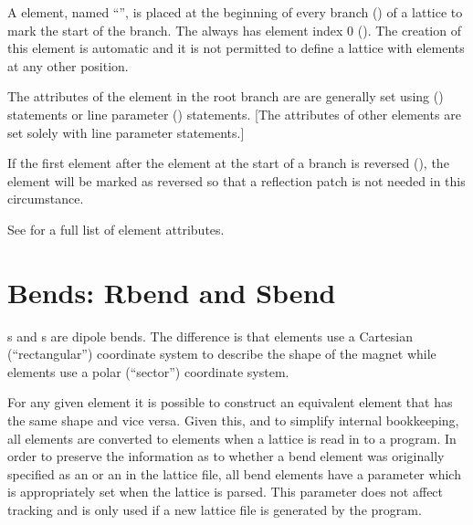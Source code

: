 A  element, named ``'', is placed at the beginning of every branch
() of a lattice to mark the start of the branch. The  always
has element index 0 (). The creation of this  element is
automatic and it is not permitted to define a lattice with  elements at any
other position.

The attributes of the  element in the root branch are are generally set using
 () statements or line parameter () statements.
[The attributes of other  elements are set solely with line parameter statements.]

If the first element after the  element at the start of a branch is reversed
(), the  element will be marked as reversed so that a
reflection patch is not needed in this circumstance.

See  for a full list of element attributes.

\section{Bends: Rbend and Sbend}
\label{s:bend}

s and s are dipole bends. The difference is that  elements use a
Cartesian (``rectangular'') coordinate system to describe the shape of the magnet while 
elements use a polar (``sector'') coordinate system. 

For any given  element it is possible to construct an equivalent  element that
has the same shape and vice versa. Given this, and to simplify internal bookkeeping, all 
elements are converted to  elements when a lattice is read in to a program.  In order to
preserve the information as to whether a bend element was originally specified as an  or
an  in the lattice file, all bend elements have a  parameter which is
appropriately set when the lattice is parsed. This  parameter does not affect tracking and
is only used if a new lattice file is generated by the program.

